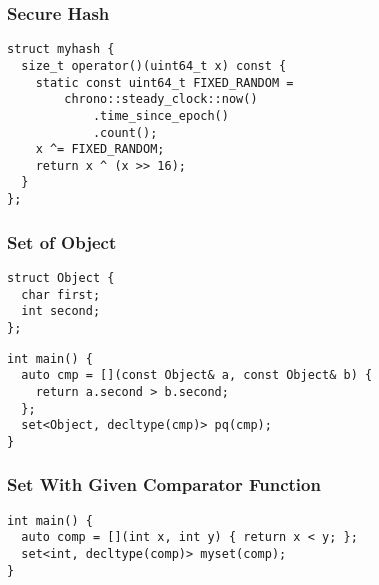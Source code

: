 \documentclass[twoside]{article}
\newcommand{\fileTitleStyle}{\large\underline}
\begin{document}
\begin{multicols*}{2}
\subsubsectionfont{\centering\bfseries\Large}
\subsubsectionfont{\fileTitleStyle}
\subsubsection*{Secure Hash}
\begin{verbatim}
struct myhash {
  size_t operator()(uint64_t x) const {
    static const uint64_t FIXED_RANDOM =
        chrono::steady_clock::now()
            .time_since_epoch()
            .count();
    x ^= FIXED_RANDOM;
    return x ^ (x >> 16);
  }
};
\end{verbatim}

\subsubsectionfont{\centering\bfseries\Large}
\subsubsectionfont{\fileTitleStyle}
\subsubsection*{Set of Object}
\begin{verbatim}
struct Object {
  char first;
  int second;
};
\end{verbatim}
\vspace{-12pt}
\begin{verbatim}
int main() {
  auto cmp = [](const Object& a, const Object& b) {
    return a.second > b.second;
  };
  set<Object, decltype(cmp)> pq(cmp);
}
\end{verbatim}

\subsubsectionfont{\centering\bfseries\Large}
\subsubsectionfont{\fileTitleStyle}
\subsubsection*{Set With Given Comparator Function}
\begin{verbatim}
int main() {
  auto comp = [](int x, int y) { return x < y; };
  set<int, decltype(comp)> myset(comp);
}
\end{verbatim}

\subsubsectionfont{\centering\bfseries\Large}
\subsubsectionfont{\fileTitleStyle}

\end{multicols*}
\end{document}
